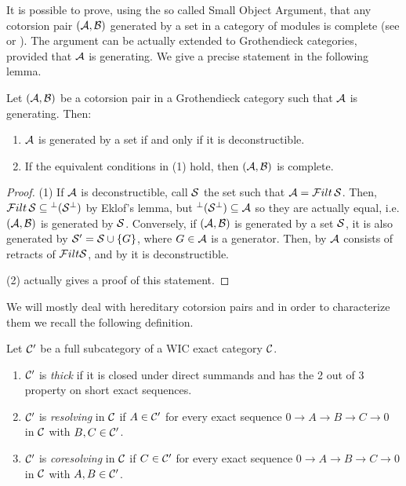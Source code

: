 It is possible to prove, using the so called Small Object Argument, that any cotorsion pair $(\mathcal{A},\mathcal{B})$ generated by a set in a category of modules is complete (see \cite{Q} or \cite{ET01}). The argument can be actually extended to Grothendieck categories, provided that $\mathcal{A}$ is generating. We give a precise statement in the following lemma.

\begin{lem}\label{lem1_2} Let $(\mathcal{A},\mathcal{B})$ be a cotorsion pair in a Grothendieck category such that $\mathcal{A}$ is generating. Then:
  \begin{enumerate}
    \item $\mathcal{A}$ is generated by a set if and only if it is deconstructible.
    \item If the equivalent conditions in (1) hold, then $(\mathcal{A},\mathcal{B})$ is complete.
  \end{enumerate}
\end{lem}

\begin{proof}
  \begin{sloppypar}
  (1) If $\mathcal{A}$ is deconstructible, call $\mathcal{S}$ the set such that ${\mathcal{A} = \mathcal{F} ilt\,\mathcal{S}}$. Then, ${\mathcal{F} ilt\,\mathcal{S} \subseteq {^\perp(\mathcal{S}^\perp)}}$ by Eklof's lemma, but ${^\perp(\mathcal{S}^\perp)}\subseteq\mathcal{A}$ so they are actually equal, i.e. $(\mathcal{A},\mathcal{B})$ is generated by $\mathcal{S}$.
  Conversely, if $(\mathcal{A},\mathcal{B})$ is generated by a set $\mathcal{S}$, it is also generated by $\mathcal{S}'=\mathcal{S}\cup\{G\}$, where $G\in\mathcal{A}$ is a generator. Then, by \cite[Theorem~5.16]{Sto13} $\mathcal{A}$ consists of retracts of $\mathcal{F} ilt \mathcal{S}$, and by \cite[Proposition~2.9(1)]{St10-deconstr} it is deconstructible.
\end{sloppypar}

  (2) \cite[Theorem~5.16]{Sto13} actually gives a proof of this statement.
\end{proof}

%


We will mostly deal with  hereditary cotorsion pairs and
in order to characterize them we recall the following definition.
\begin{defn}\label{D:thick} Let $\mathcal{C}'$ be  a full subcategory of a WIC exact category $\mathcal{C}$.
\begin{enumerate}
\item $\mathcal{C}'$ is \emph{thick} if it is closed under direct summands and has the 2 out of 3 property on short exact sequences.
\item $\mathcal{C}'$ is \emph{resolving} in $\mathcal{C}$ if $A\in \mathcal{C}'$ for every exact sequence $0\to A\to B\to C\to 0$ in $\mathcal{C}$ with $B, C\in \mathcal{C}'$.
\item $\mathcal{C}'$ is \emph{coresolving} in $\mathcal{C}$ if $C\in \mathcal{C}'$ for every exact sequence $0\to A\to B\to C\to 0$ in $\mathcal{C}$ with $A, B\in \mathcal{C}'$.
\end{enumerate}
\end{defn}

